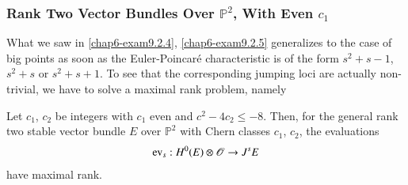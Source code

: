 \subsubsection{Rank Two Vector Bundles Over \texorpdfstring{$\mathbb{P}^{2}$}{P2}, With
Even \texorpdfstring{$c_{1}$}{c1}}\label{chap6-sec9.3.2}

What we saw in \ref{chap6-exam9.2.4}, \ref{chap6-exam9.2.5} generalizes
to the case of big points as soon as the Euler-Poincar\'e
characteristic is of the form $s^{2}+s-1$, $s^{2}+s$ or
$s^{2}+s+1$. To see that the corresponding jumping loci are actually
non-trivial, we have to solve a maximal rank problem, namely

\begin{theorem*}
Let $c_{1}$, $c_{2}$ be integers with $c_{1}$ even and
$c^{2}-4c_{2}\leq -8$. Then, for the general rank two stable vector
bundle $E$ over $\mathbb{P}^{2}$ with Chern classes $c_{1}$, $c_{2}$,
the evaluations
$$
\operatorname{ev}_{s}:H^{0}(E)\otimes \mathscr{O}\to J^{s}E
$$
have maximal rank.
\end{theorem*}

